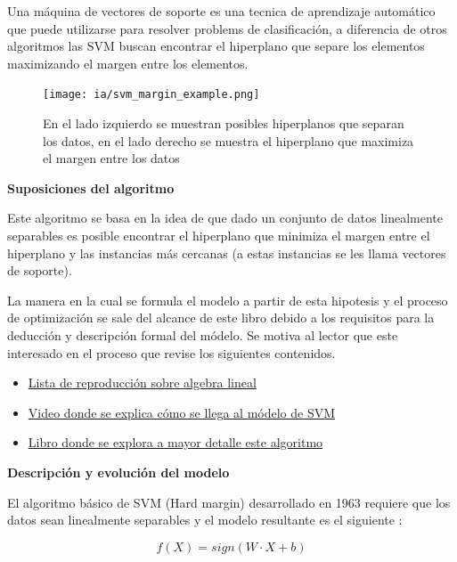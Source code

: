 \documentclass[11pt,fleqn]{book} %
\begin{document}
Una máquina de vectores de soporte es una tecnica de aprendizaje automático que puede utilizarse para resolver problems de clasificación, a diferencia de otros algoritmos las SVM buscan encontrar el hiperplano que separe los elementos maximizando el margen entre los elementos.

\begin{figure}[ht]
\centering\texttt{[image: ia/svm\_margin\_example.png]}
\caption{En el lado izquierdo se muestran posibles hiperplanos que separan los datos, en el lado derecho se muestra el hiperplano que maximiza el margen entre los datos}

\label{fig:svm_example_margin} 
\end{figure}


\textbf{Suposiciones del algoritmo}

Este algoritmo se basa en la idea de que dado un conjunto de datos linealmente separables es posible encontrar el hiperplano que minimiza el margen entre el hiperplano y las instancias más cercanas (a estas instancias se les llama vectores de soporte).

La manera en la cual se formula el modelo a partir de esta hipotesis y el proceso de optimización se sale del alcance de este libro debido a los requisitos para la deducción y descripción formal del módelo. Se motiva al lector que este interesado en el proceso que revise los siguientes contenidos.

\begin{itemize}
\item \href {https://www.youtube.com/playlist?list=PLZHQObOWTQDPD3MizzM2xVFitgF8hE_ab}{Lista de reproducción sobre algebra lineal}
\item \href{https://www.youtube.com/watch?v=_PwhiWxHK8o}{Video donde se explica cómo se llega al módelo de SVM}
\item \href{https://www.syncfusion.com/succinctly-free-ebooks/support-vector-machines-succinctly}{Libro donde se explora a mayor detalle este algoritmo}
\end{itemize}

\textbf{Descripción y evolución del modelo}

El algoritmo básico de SVM (Hard margin) desarrollado en 1963 requiere que los datos sean linealmente separables y el modelo resultante es el siguiente \cite{boswell2002introduction}:

\begin{equation}
\label{eqn:svm_basic}
f(X) = sign(W \cdot  X + b)
\end{equation}
\end{document}
